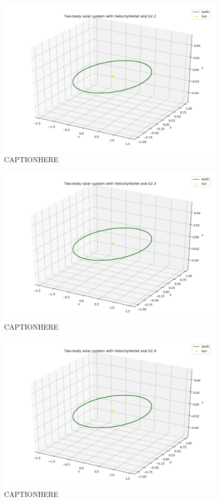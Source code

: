 \documentclass{article}
\begin{document}
    \begin{figure}[H]
        \centering
        \includegraphics[width = 11cm]{img/plot3D_S_E_V_b22.png}
        \caption{CAPTIONHERE}
        \label{fig:plot3D_S_E_V_b22}
    \end{figure}

    \begin{figure}[H]
        \centering
        \includegraphics[width = 11cm]{img/plot3D_S_E_V_b23.png}
        \caption{CAPTIONHERE}
        \label{fig:plot3D_S_E_V_b23}
    \end{figure}

    \begin{figure}[H]
        \centering
        \includegraphics[width = 11cm]{img/plot3D_S_E_V_b24.png}
        \caption{CAPTIONHERE}
        \label{fig:plot3D_S_E_V_b24}
    \end{figure}
\end{document}
